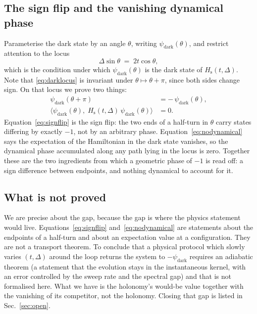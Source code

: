 \documentclass[aps,prx,nofootinbib,superscriptaddress,12pt]{revtex4-2}
\begin{document}
\subsection{The sign flip and the vanishing dynamical phase}

Parameterise the dark state by an angle $\theta$, writing
$\psi_{\mathrm{dark}}(\theta)$, and restrict attention to the locus
\begin{equation}
\Delta \sin\theta \;=\; 2t\cos\theta ,
\label{eq:darklocus}
\end{equation}
which is the condition under which $\psi_{\mathrm{dark}}(\theta)$ is the
dark state of $H_{\mathrm{s}}(t,\Delta)$. Note that
\eqref{eq:darklocus} is invariant under $\theta \mapsto \theta + \pi$,
since both sides change sign. On that locus we prove two things:
\begin{align}
\psi_{\mathrm{dark}}(\theta + \pi) &= -\,\psi_{\mathrm{dark}}(\theta),
\label{eq:signflip}\\
\bigl\langle \psi_{\mathrm{dark}}(\theta),\;
  H_{\mathrm{s}}(t,\Delta)\,\psi_{\mathrm{dark}}(\theta)\bigr\rangle &= 0 .
\label{eq:nodynamical}
\end{align}
Equation~\eqref{eq:signflip} is the sign flip: the two ends of a
half-turn in $\theta$ carry states differing by exactly $-1$, not by an
arbitrary phase. Equation~\eqref{eq:nodynamical} says the expectation of
the Hamiltonian in the dark state vanishes, so the dynamical phase
accumulated along any path lying in the locus is zero. Together these
are the two ingredients from which a geometric phase of $-1$ is read
off: a sign difference between endpoints, and nothing dynamical to
account for it.

\subsection{What is not proved}

We are precise about the gap, because the gap is where the physics
statement would live. Equations~\eqref{eq:signflip}
and~\eqref{eq:nodynamical} are statements about the endpoints of a
half-turn and about an expectation value at a configuration. They are
not a transport theorem. To conclude that a physical protocol which
slowly varies $(t,\Delta)$ around the loop returns the system to
$-\psi_{\mathrm{dark}}$ requires an adiabatic theorem (a statement
that the evolution stays in the instantaneous kernel, with an error
controlled by the sweep rate and the spectral gap) and that is not
formalised here. What we have is the holonomy's would-be value together
with the vanishing of its competitor, not the holonomy. Closing that gap
is listed in Sec.~\ref{sec:open}.
\end{document}
